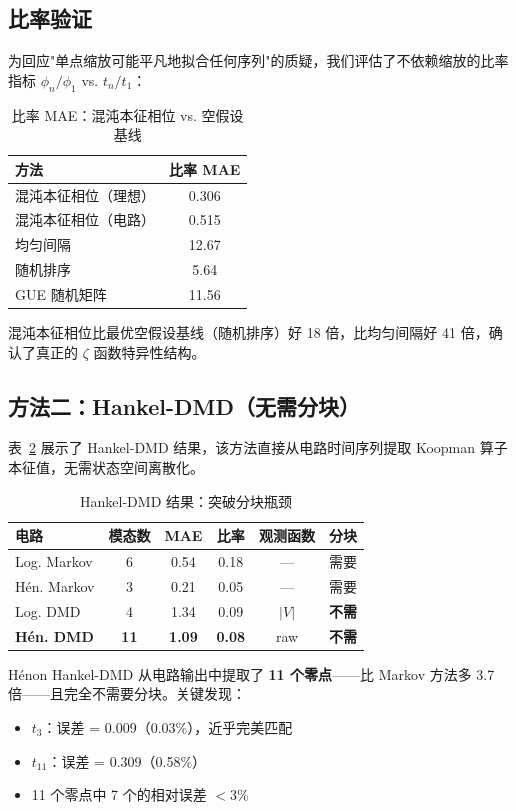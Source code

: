 \documentclass[twocolumn]{article}
\begin{document}
\subsection{比率验证}

为回应"单点缩放可能平凡地拟合任何序列"的质疑，我们评估了不依赖缩放的比率指标 $\phi_n/\phi_1$ vs. $t_n/t_1$：

\begin{table}[h]
\centering
\caption{比率 MAE：混沌本征相位 vs. 空假设基线}
\label{tab:ratio}
\begin{tabular}{lc}
\toprule
方法 & 比率 MAE \\
\midrule
混沌本征相位（理想） & 0.306 \\
混沌本征相位（电路） & 0.515 \\
均匀间隔 & 12.67 \\
随机排序 & 5.64 \\
GUE 随机矩阵 & 11.56 \\
\bottomrule
\end{tabular}
\end{table}

混沌本征相位比最优空假设基线（随机排序）好 18 倍，比均匀间隔好 41 倍，确认了真正的 $\zeta$ 函数特异性结构。

\subsection{方法二：Hankel-DMD（无需分块）}

表~\ref{tab:dmd} 展示了 Hankel-DMD 结果，该方法直接从电路时间序列提取 Koopman 算子本征值，无需状态空间离散化。

\begin{table}[h]
\centering
\caption{Hankel-DMD 结果：突破分块瓶颈}
\label{tab:dmd}
\begin{tabular}{lccccc}
\toprule
电路 & 模态数 & MAE & 比率 & 观测函数 & 分块 \\
\midrule
Log. Markov & 6 & 0.54 & 0.18 & --- & 需要 \\
H\'en. Markov & 3 & 0.21 & 0.05 & --- & 需要 \\
Log. DMD & 4 & 1.34 & 0.09 & $|V|$ & \textbf{不需} \\
\textbf{H\'en. DMD} & \textbf{11} & \textbf{1.09} & \textbf{0.08} & raw & \textbf{不需} \\
\bottomrule
\end{tabular}
\end{table}

H\'enon Hankel-DMD 从电路输出中提取了 \textbf{11 个零点}——比 Markov 方法多 3.7 倍——且完全不需要分块。关键发现：
\begin{itemize}
\item $t_3$：误差 = 0.009（0.03\%），近乎完美匹配
\item $t_{11}$：误差 = 0.309（0.58\%）
\item 11 个零点中 7 个的相对误差 $<3\%$
\end{itemize}
\end{document}
